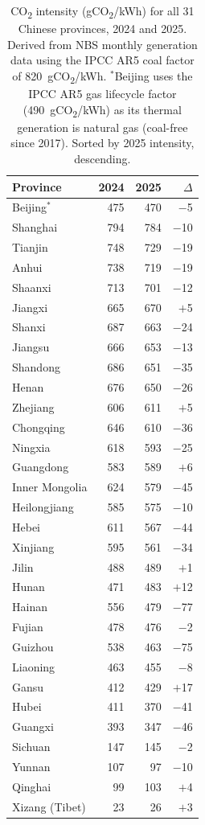 \documentclass[11pt,a4paper]{article}
\begin{document}
\begin{table}[htbp]
\centering
\renewcommand{\arraystretch}{1.2}
\small
\begin{tabular}{lrrr}
\toprule
Province & 2024 & 2025 & $\Delta$ \\
\midrule
Beijing$^*$    & 475 & 470 & $-$5  \\
Shanghai       & 794 & 784 & $-$10 \\
Tianjin        & 748 & 729 & $-$19 \\
Anhui          & 738 & 719 & $-$19 \\
Shaanxi        & 713 & 701 & $-$12 \\
Jiangxi        & 665 & 670 & $+$5  \\
Shanxi         & 687 & 663 & $-$24 \\
Jiangsu        & 666 & 653 & $-$13 \\
Shandong       & 686 & 651 & $-$35 \\
Henan          & 676 & 650 & $-$26 \\
Zhejiang       & 606 & 611 & $+$5  \\
Chongqing      & 646 & 610 & $-$36 \\
Ningxia        & 618 & 593 & $-$25 \\
Guangdong      & 583 & 589 & $+$6  \\
Inner Mongolia & 624 & 579 & $-$45 \\
Heilongjiang   & 585 & 575 & $-$10 \\
Hebei          & 611 & 567 & $-$44 \\
Xinjiang       & 595 & 561 & $-$34 \\
Jilin          & 488 & 489 & $+$1  \\
Hunan          & 471 & 483 & $+$12 \\
Hainan         & 556 & 479 & $-$77 \\
Fujian         & 478 & 476 & $-$2  \\
Guizhou        & 538 & 463 & $-$75 \\
Liaoning       & 463 & 455 & $-$8  \\
Gansu          & 412 & 429 & $+$17 \\
Hubei          & 411 & 370 & $-$41 \\
Guangxi        & 393 & 347 & $-$46 \\
Sichuan        & 147 & 145 & $-$2  \\
Yunnan         & 107 &  97 & $-$10 \\
Qinghai        &  99 & 103 & $+$4  \\
Xizang (Tibet) &  23 &  26 & $+$3  \\
\bottomrule
\end{tabular}
\vspace{4pt}
\caption{CO\textsubscript{2} intensity (gCO\textsubscript{2}/kWh) for all
31 Chinese provinces, 2024 and 2025. Derived from NBS monthly generation
data using the IPCC AR5 coal factor of 820~gCO\textsubscript{2}/kWh.
$^*$Beijing uses the IPCC AR5 gas lifecycle factor (490~gCO\textsubscript{2}/kWh)
as its thermal generation is natural gas (coal-free since 2017).
Sorted by 2025 intensity, descending.}
\label{tab:provinces}
\end{table}
\end{document}
